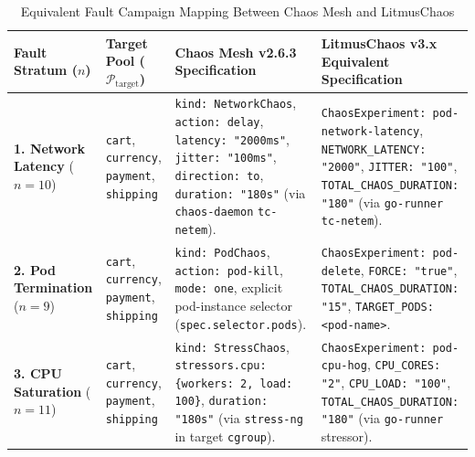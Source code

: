 \begin{table}[!tbp]
\centering
\scriptsize
\setlength{\tabcolsep}{3.5pt}
\renewcommand{\arraystretch}{1.15}
\caption{Equivalent Fault Campaign Mapping Between Chaos Mesh and LitmusChaos}
\label{tab:fault_equivalence}
\begin{tabularx}{\textwidth}{@{}>{\raggedright\arraybackslash}p{2.35cm} >{\raggedright\arraybackslash}p{2.45cm} >{\raggedright\arraybackslash}X >{\raggedright\arraybackslash}X@{}}
\toprule
\textbf{Fault Stratum ($n$)} & \textbf{Target Pool ($\mathcal{P}_{\text{target}}$)} & \textbf{Chaos Mesh v2.6.3 Specification} & \textbf{LitmusChaos v3.x Equivalent Specification} \\
\midrule
\textbf{1. Network Latency} ($n=10$) & \texttt{cart}, \texttt{currency}, \texttt{payment}, \texttt{shipping} & \texttt{kind: NetworkChaos}, \texttt{action: delay}, \texttt{latency: "2000ms"}, \texttt{jitter: "100ms"}, \texttt{direction: to}, \texttt{duration: "180s"} (via \texttt{chaos-daemon} \texttt{tc-netem}). & \texttt{ChaosExperiment: pod-network-latency}, \texttt{NETWORK\_\allowbreak LATENCY: "2000"}, \texttt{JITTER: "100"}, \texttt{TOTAL\_\allowbreak CHAOS\_\allowbreak DURATION: "180"} (via \texttt{go-runner} \texttt{tc-netem}). \\
\textbf{2. Pod Termination} ($n=9$) & \texttt{cart}, \texttt{currency}, \texttt{payment}, \texttt{shipping} & \texttt{kind: PodChaos}, \texttt{action: pod-kill}, \texttt{mode: one}, explicit pod-instance selector (\texttt{spec.\allowbreak selector.\allowbreak pods}). & \texttt{ChaosExperiment: pod-delete}, \texttt{FORCE: "true"}, \texttt{TOTAL\_\allowbreak CHAOS\_\allowbreak DURATION: "15"}, \texttt{TARGET\_\allowbreak PODS: <pod-name>}. \\
\textbf{3. CPU Saturation} ($n=11$) & \texttt{cart}, \texttt{currency}, \texttt{payment}, \texttt{shipping} & \texttt{kind: StressChaos}, \texttt{stressors.cpu: \{workers: 2, load: 100\}}, \texttt{duration: "180s"} (via \texttt{stress-ng} in target \texttt{cgroup}). & \texttt{ChaosExperiment: pod-cpu-hog}, \texttt{CPU\_\allowbreak CORES: "2"}, \texttt{CPU\_\allowbreak LOAD: "100"}, \texttt{TOTAL\_\allowbreak CHAOS\_\allowbreak DURATION: "180"} (via \texttt{go-runner} stressor). \\
\bottomrule
\end{tabularx}
\end{table}
